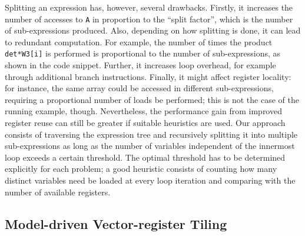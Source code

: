 Splitting an expression has, however, several drawbacks. Firstly, it increases the number of accesses to \texttt{A} in proportion to the ``split factor'', which is the number of sub-expressions produced. Also, depending on how splitting is done, it can lead to redundant computation. For example, the number of times the product \texttt{det*W3[i]} is performed is proportional to the number of sub-expressions, as shown in the code snippet. Further, it increases loop overhead, for example through additional branch instructions. Finally, it might affect register locality: for instance, the same array could be accessed in different sub-expressions, requiring a proportional number of loads be performed; this is not the case of the running example, though. Nevertheless, the performance gain from improved register reuse can still be greater if suitable heuristics are used. Our approach consists of traversing the expression tree and recursively splitting it into multiple sub-expressions as long as the number of variables independent of the innermost loop exceeds a certain threshold. The optimal threshold has to be determined explicitly for each problem; a good heuristic consists of counting how many distinct variables need be loaded at every loop iteration and comparing with the number of available registers.

\subsection{Model-driven Vector-register Tiling}
\label{sec:coffee-opvect}

